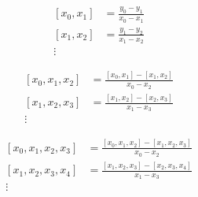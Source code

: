 \begin{shaded}
\begin{minipage}{.5\textwidth}

 \begin{equation}
 \left.\begin{aligned}
  [x_0,x_1]&=\frac{y_0-y_1}{x_0-x_1}\\
  [x_1,x_2]&=\frac{y_1-y_2}{x_1-x_2} \\
\vdots &
 \end{aligned}\right.
\end{equation} 
\end{minipage}\begin{minipage}{.5\textwidth}
 \begin{equation}
 \left.\begin{aligned}
  [x_0,x_1,x_2]&=\frac{[x_0,x_1]-[x_1,x_2]}{x_0-x_2}\\
  [x_1,x_2,x_3]&=\frac{[x_1,x_2]-[x_2,x_3]}{x_1-x_3} \\
\vdots &
 \end{aligned}\right.
\end{equation} 

\end{minipage}\end{shaded}
\begin{shaded}
 \begin{equation}
 \left.\begin{aligned}
  [x_0,x_1,x_2,x_3]&=\frac{[x_0,x_1,x_2]-[x_1,x_2,x_3]}{x_0-x_2}\\
  [x_1,x_2,x_3,x_4]&=\frac{[x_1,x_2,x_3]-[x_2,x_3,x_4]}{x_1-x_3} \\
\vdots &
 \end{aligned}\right.
\end{equation} 
\end{shaded}
